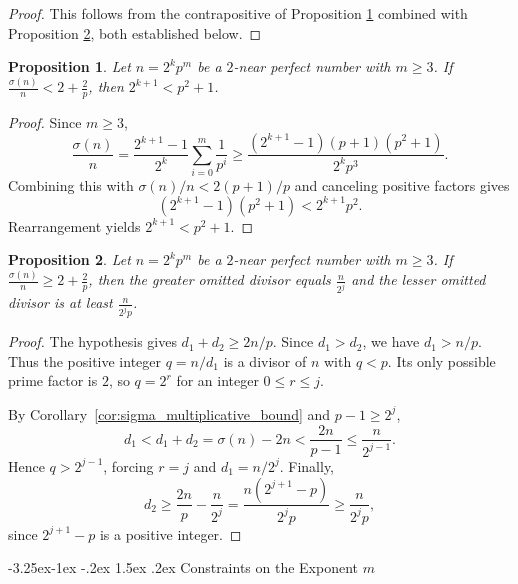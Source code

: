 \documentclass[10pt]{article}
\makeatletter
\renewcommand\subsection{\@startsection{subsection}{2}{\z@}
{-3.25ex\@plus -1ex \@minus -.2ex}
{1.5ex \@plus .2ex}
{\normalfont\normalsize\bfseries\boldmath}}
\newtheorem{proposition}{Proposition}
\theoremstyle{definition}
\makeatother
\begin{document}
\begin{proof}
This follows from the contrapositive of Proposition \ref{prop:abundance_constraint} combined with Proposition \ref{prop:divisor_bounds}, both established below.
\end{proof}

\begin{proposition}\label{prop:abundance_constraint}
Let $n=2^kp^m$ be a $2$-near perfect number with $m\geq 3$. If $\frac{\sigma(n)}{n}<2+\frac{2}{p}$, then $2^{k+1}<p^2+1$.
\end{proposition}

\begin{proof}
Since $m\ge3$,
\[
\frac{\sigma(n)}n
=\frac{2^{k+1}-1}{2^k}\sum_{i=0}^{m}\frac1{p^i}
\ge\frac{(2^{k+1}-1)(p+1)(p^2+1)}{2^kp^3}.
\]
Combining this with $\sigma(n)/n<2(p+1)/p$ and canceling
positive factors gives
\[
(2^{k+1}-1)(p^2+1)<2^{k+1}p^2.
\]
Rearrangement yields $2^{k+1}<p^2+1$.
\end{proof}

\begin{proposition}\label{prop:divisor_bounds}
Let $n=2^kp^m$ be a $2$-near perfect number with $m\geq 3$. If $\frac{\sigma(n)}{n}\geq 2+\frac{2}{p}$, then the greater omitted divisor equals $\frac{n}{2^j}$ and the lesser omitted divisor is at least $\frac{n}{2^jp}$.
\end{proposition}

\begin{proof}
The hypothesis gives $d_1+d_2\ge2n/p$. Since $d_1>d_2$,
we have $d_1>n/p$. Thus the positive integer $q=n/d_1$ is a divisor of $n$ with $q<p$. Its only possible prime factor is $2$, so $q=2^r$ for an integer $0\le r\le j$.

By Corollary~\ref{cor:sigma_multiplicative_bound} and $p-1\ge2^j$,
\[
d_1<d_1+d_2=\sigma(n)-2n
<\frac{2n}{p-1}\le\frac{n}{2^{j-1}}.
\]
Hence $q>2^{j-1}$, forcing $r=j$ and $d_1=n/2^j$.
Finally,
\[
d_2\ge\frac{2n}{p}-\frac{n}{2^j}
=\frac{n(2^{j+1}-p)}{2^jp}\ge\frac{n}{2^jp},
\]
since $2^{j+1}-p$ is a positive integer.
\end{proof}

\subsection{Constraints on the Exponent $m$}
\label{sec:parity-and-m-odd}
\end{document}
